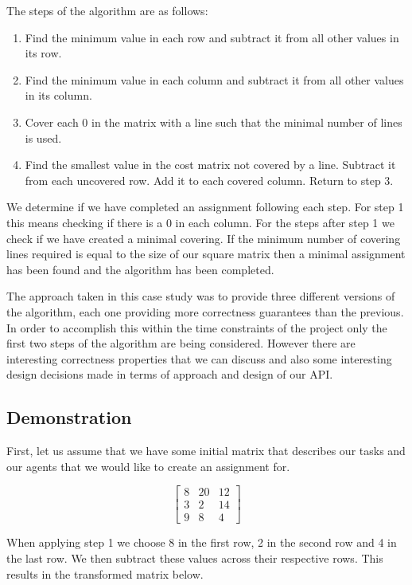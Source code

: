 \documentclass[a4paper, notitlepage]{report}
\begin{document}
The steps of the algorithm are as follows:
\begin{enumerate}
\item Find the minimum value in each row and subtract it from all other values in
its row.
\item Find the minimum value in each column and subtract it from all other values
in its column.
\item Cover each 0 in the matrix with a line such that the minimal number of lines
is used.
\item Find the smallest value in the cost matrix not covered by a line. Subtract it
from each uncovered row. Add it to each covered column. Return to step 3.
\end{enumerate}

We determine if we have completed an assignment following each step. For step 1
this means checking if there is a 0 in each column. For the steps after step 1
we check if we have created a minimal covering. If the minimum number of
covering lines required is equal to the size of our square matrix then a minimal
assignment has been found and the algorithm has been completed.

The approach taken in this case study was to provide three different versions of
the algorithm, each one providing more correctness guarantees than the previous.
In order to accomplish this within the time constraints of the project only the
first two steps of the algorithm are being considered. However there are
interesting correctness properties that we can discuss and also some interesting
design decisions made in terms of approach and design of our API.

\subsection{Demonstration}
\label{sec:org04f5d49}
First, let us assume that we have some initial matrix that describes our tasks
and our agents that we would like to create an assignment for.

\[ \begin{bmatrix}
8 & 20 & 12 \\
3 & 2 & 14 \\
9 & 8 & 4
\end{bmatrix} \]

When applying step 1 we choose 8 in the first row, 2 in the second row and 4 in
the last row. We then subtract these values across their respective rows. This
results in the transformed matrix below.
\end{document}
